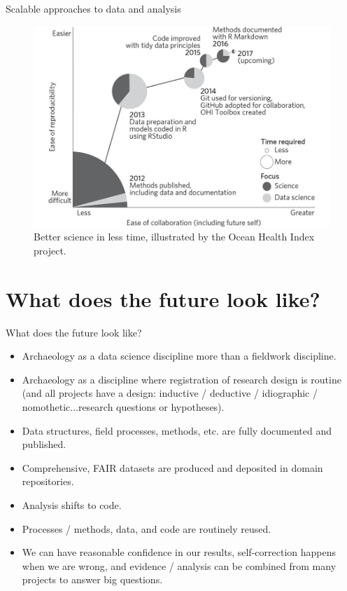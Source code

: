 \documentclass[aspectratio=169, 11pt]{beamer} %
\begin{document}
\begin{frame}{Scalable approaches to data and analysis}
  \begin{figure}[H]
    \centering
        \includegraphics[height=.7\textheight]{figures/Ocean-Health-Index.jpg}
        \caption{Better science in less time, illustrated by the Ocean Health Index project. \cite{Stewart_Lowndes2017-lj}}
        \label{fig:stewart_lowndes}
  \end{figure}
\end{frame}

\section{What does the future look like?}

\begin{frame}{What does the future look like?}
    \begin{itemize}[label=\textbullet]
        \item Archaeology as a data science discipline more than a fieldwork discipline.
        \item Archaeology as a discipline where registration of research design is routine (and all projects have a design: inductive / deductive / idiographic / nomothetic...research questions or hypotheses).
        \item Data structures, field processes, methods, etc. are fully documented and published.
        \item Comprehensive, FAIR datasets are produced and deposited in domain repositories. 
        \item Analysis shifts to code.
        \item Processes / methods, data, and code are routinely reused. 
        \item We can have reasonable confidence in our results, self-correction happens when we are wrong, and evidence / analysis can be combined from many projects to answer big questions.
    \end{itemize}
\end{frame}
\end{document}
